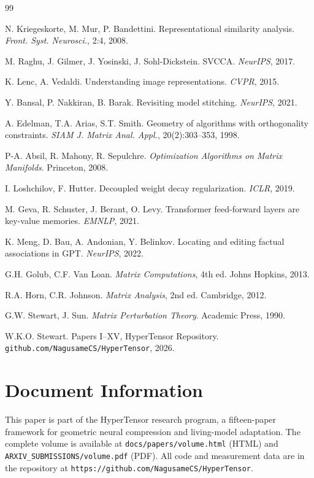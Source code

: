 \documentclass[11pt,a4paper]{article}
\begin{document}
\begin{thebibliography}{99}

N. Kriegeskorte, M. Mur, P. Bandettini. Representational similarity analysis. \textit{Front. Syst. Neurosci.}, 2:4, 2008.

M. Raghu, J. Gilmer, J. Yosinski, J. Sohl-Dickstein. SVCCA. \textit{NeurIPS}, 2017.

K. Lenc, A. Vedaldi. Understanding image representations. \textit{CVPR}, 2015.

Y. Bansal, P. Nakkiran, B. Barak. Revisiting model stitching. \textit{NeurIPS}, 2021.

A. Edelman, T.A. Arias, S.T. Smith. Geometry of algorithms with orthogonality constraints. \textit{SIAM J. Matrix Anal. Appl.}, 20(2):303--353, 1998.

P-A. Absil, R. Mahony, R. Sepulchre. \textit{Optimization Algorithms on Matrix Manifolds}. Princeton, 2008.

I. Loshchilov, F. Hutter. Decoupled weight decay regularization. \textit{ICLR}, 2019.

M. Geva, R. Schuster, J. Berant, O. Levy. Transformer feed-forward layers are key-value memories. \textit{EMNLP}, 2021.

K. Meng, D. Bau, A. Andonian, Y. Belinkov. Locating and editing factual associations in GPT. \textit{NeurIPS}, 2022.

G.H. Golub, C.F. Van Loan. \textit{Matrix Computations}, 4th ed. Johns Hopkins, 2013.

R.A. Horn, C.R. Johnson. \textit{Matrix Analysis}, 2nd ed. Cambridge, 2012.

G.W. Stewart, J. Sun. \textit{Matrix Perturbation Theory}. Academic Press, 1990.

W.K.O. Stewart. Papers I--XV, HyperTensor Repository. \texttt{github.com/NagusameCS/HyperTensor}, 2026.

\end{thebibliography}

\newpage

\section*{Document Information}

This paper is part of the HyperTensor research program, a fifteen-paper framework for geometric neural compression and living-model adaptation. The complete volume is available at \texttt{docs/papers/volume.html} (HTML) and \texttt{ARXIV\_SUBMISSIONS/volume.pdf} (PDF). All code and measurement data are in the repository at \texttt{https://github.com/NagusameCS/HyperTensor}.
\end{document}

